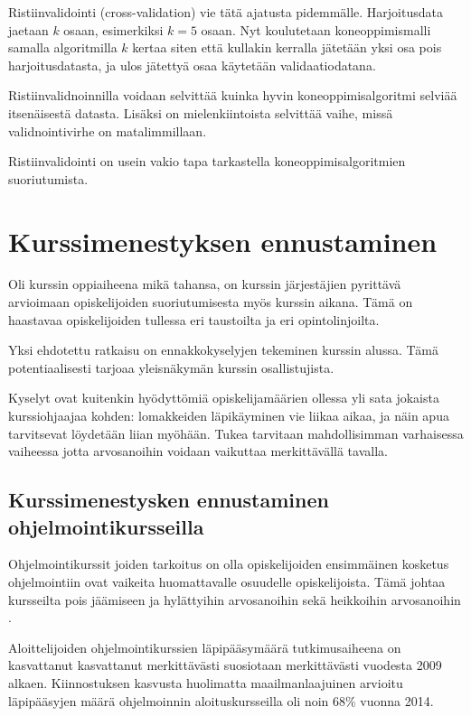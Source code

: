 \documentclass[finnish,twoside,openright]{HYgraduMLDS}
\begin{document}
Ristiinvalidointi (cross-validation) vie tätä ajatusta pidemmälle. Harjoitusdata jaetaan $k$ osaan, esimerkiksi $k=5$ osaan. Nyt koulutetaan koneoppimismalli samalla algoritmilla $k$ kertaa siten että kullakin kerralla jätetään yksi osa pois harjoitusdatasta, ja ulos jätettyä osaa käytetään validaatiodatana. 

Ristiinvalidnoinnilla voidaan selvittää kuinka hyvin koneoppimisalgoritmi selviää itsenäisestä datasta. Lisäksi on mielenkiintoista selvittää vaihe, missä validnointivirhe on matalimmillaan\cite{james2013ISLR}. 

Ristiinvalidointi on usein vakio tapa tarkastella koneoppimisalgoritmien suoriutumista\cite{james2013ISLR}.

 
\section{Kurssimenestyksen ennustaminen}

Oli kurssin oppiaiheena mikä tahansa, on kurssin järjestäjien pyrittävä arvioimaan opiskelijoiden suoriutumisesta myös kurssin aikana. Tämä on haastavaa opiskelijoiden tullessa eri taustoilta ja eri opintolinjoilta.

Yksi ehdotettu ratkaisu on ennakkokyselyjen tekeminen kurssin alussa\cite{watson2014no}. Tämä potentiaalisesti tarjoaa yleisnäkymän kurssin osallistujista.

Kyselyt ovat kuitenkin hyödyttömiä opiskelijamäärien ollessa yli sata jokaista kurssiohjaajaa kohden: lomakkeiden läpikäyminen vie liikaa aikaa, ja näin apua tarvitsevat löydetään liian myöhään. Tukea tarvitaan mahdollisimman varhaisessa vaiheessa jotta arvosanoihin voidaan vaikuttaa merkittävällä tavalla\cite{bergin2015using}.

\subsection{Kurssimenestysken ennustaminen ohjelmointikursseilla}

Ohjelmointikurssit joiden tarkoitus on olla opiskelijoiden ensimmäinen kosketus ohjelmointiin ovat vaikeita huomattavalle osuudelle opiskelijoista. Tämä johtaa kursseilta pois jäämiseen ja hylättyihin arvosanoihin sekä heikkoihin arvosanoihin \cite{bergin2015using}. 

Aloittelijoiden ohjelmointikurssien läpipääsymäärä tutkimusaiheena on kasvattanut kasvattanut merkittävästi suosiotaan merkittävästi vuodesta 2009 alkaen\cite{hellas2018predicting}. Kiinnostuksen kasvusta huolimatta maailmanlaajuinen arvioitu läpipääsyjen määrä ohjelmoinnin aloituskursseilla oli noin 68\% vuonna 2014\cite{watson2014failure}. 
\end{document}
